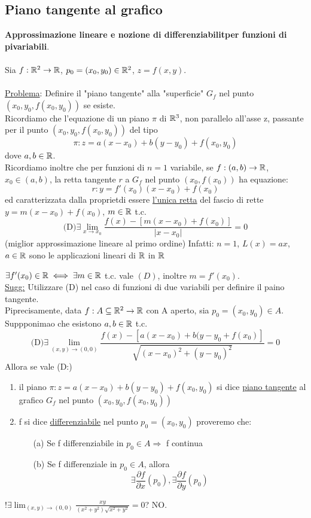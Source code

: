 \subsection{Piano tangente al grafico}
\textbf{Approssimazione lineare e nozione di differenziabilit\aca per funzioni di pi\acu variabili}. \\\\
Sia $f:\mathbb{R}^2 \to \mathbb{R}$, $p_0 = (x_0,y_0) \in \mathbb{R}^2$, $z=f(x,y)$. \\\\
\underline{Problema}: Definire il "piano tangente" alla "superficie" $G_f$ nel punto $(x_0,y_0,f(x_0,y_0))$ se esiste.\\
Ricordiamo che l'equazione di un piano $\pi$ di $\mathbb{R}^3$, non parallelo all'asse z, passante per il punto 
$(x_0,y_0,f(x_0,y_0))$ \ace del tipo 
$$\pi : z = a(x-x_0) + b(y-y_0) + f(x_0,y_0)$$
dove $a,b \in \mathbb{R}$.\\
Ricordiamo inoltre che per funzioni di $n=1$ variabile, se $f:(a,b) \to \mathbb{R}$, $x_0\in (a,b)$, la retta tangente $r$ a 
$G_f$ nel punto $(x_0,f(x_0))$ ha equazione:
$$r: y = f'(x_0)(x-x_0) + f(x_0)$$
ed \ace caratterizzata dalla propriet\aca di essere \underline{l'unica retta} del fascio di rette $y=m(x-x_0)+f(x_0)$, 
$m\in\mathbb{R}$ t.c. 
$$\text{(D)} \exists \lim_{x\to x_0}\frac{f(x)-\left[m(x-x_0)+f(x_0)\right]}{\lvert x-x_0\rvert} = 0$$
(miglior approssimazione lineare al primo ordine)
Infatti: $n=1$, $L(x) = ax$, $a\in\mathbb{R}$ sono le applicazioni lineari di $\mathbb{R}$ in $\mathbb{R}$
\begin{exercise}
  $\exists f'(x_0) \in \mathbb{R} \iff \exists m \in \mathbb{R}$ t.c. vale $(D)$, inoltre $m = f'(x_0)$. \\
  \underline{Sugg:} Utilizzare (D) nel caso di funzioni di due variabili per definire il paino tangente. \\
  Pi\acu precisamente, data $f: A \subseteq \mathbb{R}^2 \to \mathbb{R}$ con A aperto, sia $p_0=(x_0,y_0)\in A$. Suppponimao che esistono $a,b \in \mathbb{R}$ t.c.
  $$\text{(D)} \exists \lim_{(x,y)\to (0,0)}\frac{f(x)-\left[a(x-x_0)+b(y-y_0+f(x_0)\right]}{\sqrt{(x-x_0)^2+(y-y_0)^2}} = 0$$
  Allora se vale (D:)
\end{exercise}
\begin{definition}
  \begin{enumerate}
    \item il piano $\pi : z = a(x-x_0)+b(y-y_0)+f(x_0,y_0)$ si dice \underline{piano tangente} al grafico $G_f$ nel punto $\left(x_0,y_0,f(x_0,y_0)\right)$
    \item f si dice \underline{differenziabile} nel punto $p_0 = (x_0,y_0)$ proveremo che:
      \begin{enumerate}
        \item[(a)] Se f \ace differenziabile in $p_0 \in A \Rightarrow $ f \ace continua
        \item[(b)] Se f \ace differenziale in $p_0 \in A$, allora 
                   $$\exists \frac{\partial f}{\partial x}(p_0), \exists \frac{\partial f}{\partial y}(p_0)$$   
      \end{enumerate}
  \end{enumerate}
\end{definition}
\begin{exercise}
  $!\exists \lim_{(x,y) \to (0,0)} \frac{xy}{(x^2+y^2)\sqrt{x^2+y^2}} = 0$? NO.
\end{exercise}
